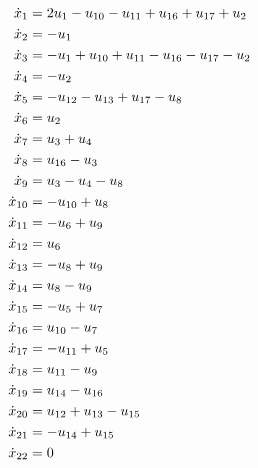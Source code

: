 
\begin{equation}
\begin{aligned}
\dot x_{1} &=
{
2 u_{1} - u_{10} - u_{11} + u_{16} + u_{17} + u_{2}
}
\cr
\dot x_{2} &=
{
 - u_{1}
}
\cr
\dot x_{3} &=
{
 - u_{1} + u_{10} + u_{11} - u_{16} - u_{17} - u_{2}
}
\cr
\dot x_{4} &=
{
 - u_{2}
}
\cr
\dot x_{5} &=
{
 - u_{12} - u_{13} + u_{17} - u_{8}
}
\cr
\dot x_{6} &=
{
u_{2}
}
\cr
\dot x_{7} &=
{
u_{3} + u_{4}
}
\cr
\dot x_{8} &=
{
u_{16} - u_{3}
}
\cr
\dot x_{9} &=
{
u_{3} - u_{4} - u_{8}
}
\cr
\dot x_{10} &=
{
 - u_{10} + u_{8}
}
\cr
\dot x_{11} &=
{
 - u_{6} + u_{9}
}
\cr
\dot x_{12} &=
{
u_{6}
}
\cr
\dot x_{13} &=
{
 - u_{8} + u_{9}
}
\cr
\dot x_{14} &=
{
u_{8} - u_{9}
}
\cr
\dot x_{15} &=
{
 - u_{5} + u_{7}
}
\cr
\dot x_{16} &=
{
u_{10} - u_{7}
}
\cr
\dot x_{17} &=
{
 - u_{11} + u_{5}
}
\cr
\dot x_{18} &=
{
u_{11} - u_{9}
}
\cr
\dot x_{19} &=
{
u_{14} - u_{16}
}
\cr
\dot x_{20} &=
{
u_{12} + u_{13} - u_{15}
}
\cr
\dot x_{21} &=
{
 - u_{14} + u_{15}
}
\cr
\dot x_{22} &=
{
0
}
\end{aligned}
\end{equation}
